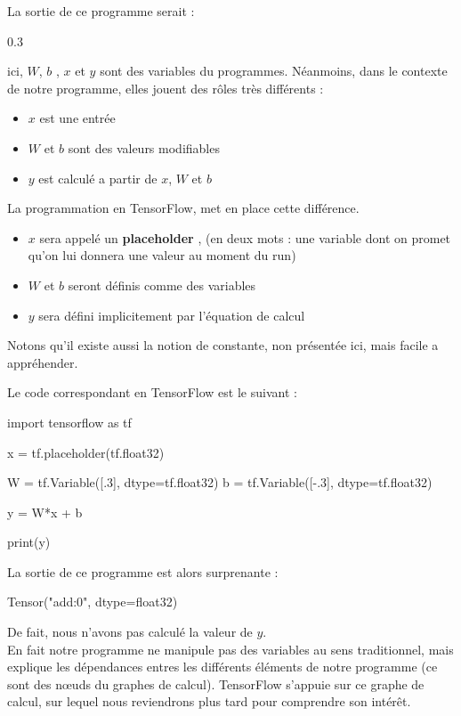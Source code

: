 \documentclass[a4paper,11pt]{book}
\theoremstyle{theo}
\begin{document}
La sortie de ce programme serait :
\begin{myoutput}
0.3
\end{myoutput}

ici, $W$, $b$ , $x$ et $y$ sont des variables du programmes.
Néanmoins, dans le contexte de notre programme, elles jouent des rôles très différents :
\begin{itemize}
\item $x$ est une entrée 
\item $W$ et $b$ sont des valeurs modifiables
\item $y$ est calculé a partir de $x$, $W$ et $b$
\end{itemize}

La programmation en TensorFlow, met en place cette différence.
\begin{itemize}
\item $x$ sera appelé un \textbf{placeholder} , (en deux mots : une variable dont on promet qu'on lui donnera une valeur au moment du run)
\item $W$ et $b$ seront définis comme des variables
\item $y$ sera défini implicitement par l'équation de calcul 
\end{itemize}

Notons qu'il existe aussi la notion de constante, non présentée ici, mais facile a appréhender.

Le code correspondant en TensorFlow est le suivant :
\begin{mypython}
import tensorflow as tf

x = tf.placeholder(tf.float32)

W = tf.Variable([.3], dtype=tf.float32)
b = tf.Variable([-.3], dtype=tf.float32)

y = W*x + b

print(y)
\end{mypython}

La sortie de ce programme est alors surprenante :
\begin{myoutput}
Tensor("add:0", dtype=float32)
\end{myoutput}

De fait, nous n'avons pas calculé la valeur de $y$.\\
En fait notre programme ne manipule pas des variables au sens traditionnel, mais explique les dépendances entres les différents éléments de notre programme (ce sont des nœuds du graphes de calcul). TensorFlow s'appuie sur ce graphe de calcul, sur lequel nous reviendrons plus tard pour comprendre son intérêt.\\
\end{document}
